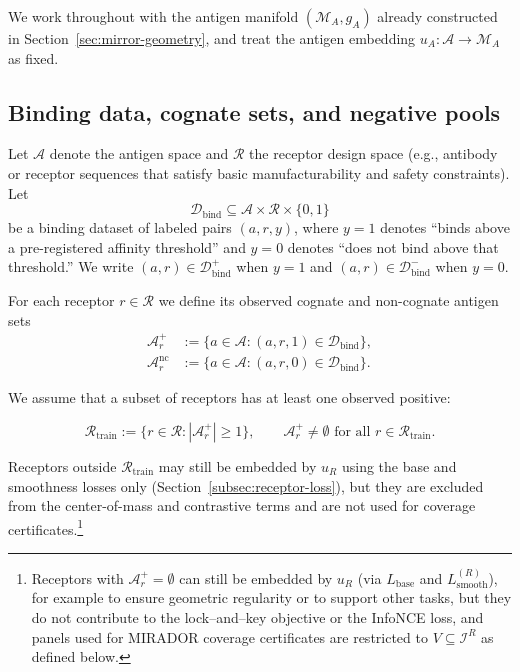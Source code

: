 \documentclass[11pt]{article}
\newcommand{\Ical}{\mathcal{I}}
\newcommand{\Dcal}{\mathcal{D}}
\newcommand{\Rcal}{\mathcal{R}}
\newcommand{\M}{\mathcal{M}}
\newcommand{\Acal}{\mathcal{A}}
\begin{document}
We work throughout with the antigen manifold $(\M_A,g_A)$ already constructed
in Section~\ref{sec:mirror-geometry}, and treat the antigen embedding
$u_A : \Acal \to \M_A$ as fixed.

\subsection{Binding data, cognate sets, and negative pools}

Let $\Acal$ denote the antigen space and $\Rcal$ the receptor design space
(e.g., antibody or receptor sequences that satisfy basic manufacturability and
safety constraints). Let
\[
  \Dcal_{\mathrm{bind}} \subseteq \Acal \times \Rcal \times \{0,1\}
\]
be a binding dataset of labeled pairs $(a,r,y)$, where $y=1$ denotes
“binds above a pre-registered affinity threshold” and $y=0$ denotes
“does not bind above that threshold.”
We write $(a,r)\in\Dcal_{\mathrm{bind}}^+$ when $y=1$ and
$(a,r)\in\Dcal_{\mathrm{bind}}^-$ when $y=0$.

For each receptor $r \in \Rcal$ we define its observed cognate and non-cognate
antigen sets
\begin{align*}
  \Acal_r^+ &:= \{ a \in \Acal : (a,r,1) \in \Dcal_{\mathrm{bind}} \},\\
  \Acal_r^{\mathrm{nc}} &:= \{ a \in \Acal : (a,r,0) \in \Dcal_{\mathrm{bind}} \}.
\end{align*}

We assume that a subset of receptors has at least one observed positive:

\begin{equation}
  \Rcal_{\mathrm{train}} := \bigl\{ r \in \Rcal : |\Acal_r^+| \ge 1 \bigr\},
  \qquad
  \Acal_r^+ \neq \emptyset \text{ for all } r \in \Rcal_{\mathrm{train}}.
  \label{eq:Rtrain}
\end{equation}

Receptors outside $\Rcal_{\mathrm{train}}$ may still be embedded by $u_R$ using
the base and smoothness losses only (Section~\ref{subsec:receptor-loss}),
but they are excluded from the center-of-mass and contrastive terms and are
not used for coverage certificates.\footnote{Receptors with
$\Acal_r^+ = \emptyset$ can still be embedded by $u_R$ (via $L_{\mathrm{base}}$
and $L_{\mathrm{smooth}}^{(R)}$), for example to ensure geometric regularity or
to support other tasks, but they do not contribute to the lock–and–key
objective or the InfoNCE loss, and panels used for MIRADOR coverage
certificates are restricted to $V \subseteq \Ical^R$ as defined below.}
\end{document}
